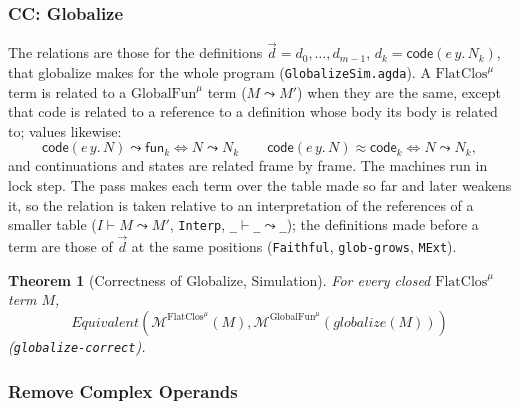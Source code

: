 \documentclass[10pt]{article}
\theoremstyle{acmplain}
\newtheorem{theorem}{Theorem}[section]
\newcommand{\key}[1]{\mathsf{#1}}
\newcommand{\pass}[1]{\mathit{#1}}
\newcommand{\funref}[1]{\key{fun}_{#1}}
\newcommand{\Mach}[1]{\mathcal{M}^{#1}}
\newcommand{\Equiv}{\mathit{Equivalent}}
\newcommand{\codeV}[1]{\key{code}_{#1}}
\newcommand{\Tcodetm}[3]{\key{code}(#1\,#2.\,#3)}  %
\newcommand{\TcodeV}[1]{\key{code}(#1)}                   %
\newcommand{\Ml}[1]{\textrm{#1}^{\mu}}                  %
\begin{document}
\subsubsection{CC: Globalize}

The relations are those for the definitions
$\vec{d} = d_0, \ldots, d_{m-1}$, $d_k = \Tcodetm{e}{y}{N_k}$, that globalize
makes for the whole program (\texttt{GlobalizeSim.agda}). A $\Ml{FlatClos}$
term is related to a $\Ml{GlobalFun}$ term ($M \leadsto M'$) when they are the
same, except that code is related to a reference to a definition whose
body its body is related to; values likewise:
\[
  \Tcodetm{e}{y}{N} \leadsto \funref{k} \iff N \leadsto N_k \qquad
  \TcodeV{e\, y.\, N} \approx \codeV{k} \iff N \leadsto N_k ,
\]
and continuations and states are related frame by frame. The machines run
in lock step. The pass makes each term over the table made so far and
later weakens it, so the relation is taken relative to an interpretation
of the references of a smaller table ($I \vdash M \leadsto M'$,
\texttt{Interp}, \texttt{\_$\vdash$\_$\leadsto$\_}); the definitions made
before a term are those of $\vec{d}$ at the same positions
(\texttt{Faithful}, \texttt{glob-grows}, \texttt{MExt}).
\begin{theorem}[Correctness of Globalize, Simulation]\label{thm:m-cek-globalize}
For every closed $\Ml{FlatClos}$ term $M$,
\[ \Equiv(\Mach{\Ml{FlatClos}}(M), \Mach{\Ml{GlobalFun}}(\pass{globalize}(M))) \]
(\texttt{globalize-correct}).
\end{theorem}

\subsubsection{Remove Complex Operands}
\end{document}
